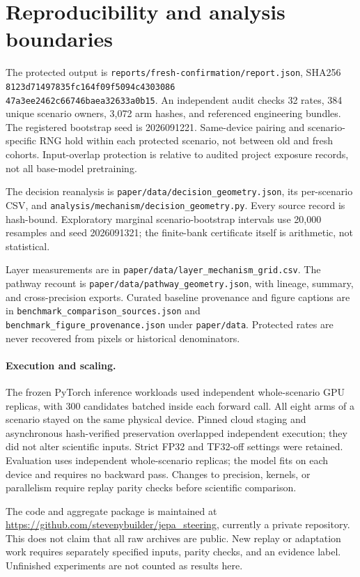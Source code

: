 \documentclass{article}
\begin{document}
\clearpage
\section{Reproducibility and analysis boundaries}
\label{app:repro}

The protected output is \texttt{reports/fresh-confirmation/report.json}, SHA256
\texttt{8123d71497835fc164f09f5094c4303086}\\
\texttt{47a3ee2462c66746baea32633a0b15}.
An independent audit checks 32 rates, 384 unique scenario owners, 3,072 arm hashes, and referenced engineering bundles. The registered bootstrap seed is 2026091221. Same-device pairing and scenario-specific RNG hold within each protected scenario, not between old and fresh cohorts. Input-overlap protection is relative to audited project exposure records, not all base-model pretraining.

The decision reanalysis is \texttt{paper/data/decision\_geometry.json}, its per-scenario CSV, and \texttt{analysis/mechanism/decision\_geometry.py}. Every source record is hash-bound. Exploratory marginal scenario-bootstrap intervals use 20,000 resamples and seed 2026091321; the finite-bank certificate itself is arithmetic, not statistical.

Layer measurements are in \texttt{paper/data/layer\_mechanism\_grid.csv}. The pathway recount is \texttt{paper/data/pathway\_geometry.json}, with lineage, summary, and cross-precision exports. Curated baseline provenance and figure captions are in \texttt{benchmark\_comparison\_sources.json} and \texttt{benchmark\_figure\_provenance.json} under \texttt{paper/data}. Protected rates are never recovered from pixels or historical denominators.

\paragraph{Execution and scaling.}
The frozen PyTorch inference workloads used independent whole-scenario GPU replicas, with 300 candidates batched inside each forward call. All eight arms of a scenario stayed on the same physical device. Pinned cloud staging and asynchronous hash-verified preservation overlapped independent execution; they did not alter scientific inputs. Strict FP32 and TF32-off settings were retained. Evaluation uses independent whole-scenario replicas; the model fits on each device and requires no backward pass. Changes to precision, kernels, or parallelism require replay parity checks before scientific comparison.

The code and aggregate package is maintained at \url{https://github.com/stevenybuilder/jepa_steering}, currently a private repository. This does not claim that all raw archives are public. New replay or adaptation work requires separately specified inputs, parity checks, and an evidence label. Unfinished experiments are not counted as results here.
\end{document}
